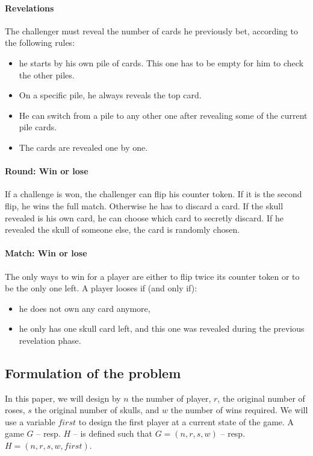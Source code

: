\documentclass[]{article}       %
\begin{document}
\paragraph{Revelations}
The challenger must reveal the number of cards he previously bet, according to the following rules:
\begin{itemize}
\item he starts by his own pile of cards. This one has to be empty for him to check the other piles.
\item On a specific pile, he always reveals the top card.
\item He can switch from a pile to any other one after revealing some of the current pile cards.
\item The cards are revealed one by one.
\end{itemize}

\paragraph{Round: Win or lose}
If a challenge is won, the challenger can flip his counter token. If it is the second flip, he wins the full match.
Otherwise he has to discard a card. If the skull revealed is his own card, he can choose which card to secretly discard. If he revealed the skull of someone else,  the card is randomly chosen.

\paragraph{Match: Win or lose}
The only ways to win for a player are either to flip twice its counter token or to be the only one left.
A player looses if (and only if):
\begin{itemize}
\item he does not own any card anymore,
\item he only has one skull card left, and this one was revealed during the previous revelation phase.
\end{itemize} 

\subsection{Formulation of the problem}
In this paper, we will design by $n$ the number of player, $r$, the original number of roses, $s$ the original number of skulls, and $w$ the number of wins required. We will use a variable $first$ to design the first player at a current state of the game.
A game $G$ -- resp. $H$ -- is defined such that $G=(n,r,s,w)$ -- resp. $H=(n,r,s,w,first)$.\newline
\end{document}

